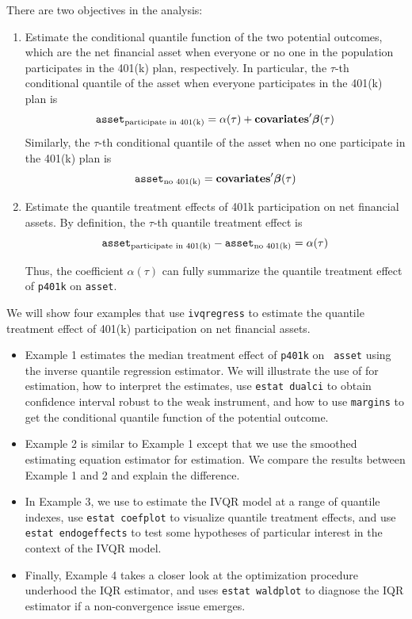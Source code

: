 There are two objectives in the analysis:
\begin{enumerate}

\item Estimate the conditional quantile function of the two potential outcomes,
which are the net financial asset when everyone or no one in the population
participates in the 401(k) plan, respectively. In particular, the $\tau$-th
conditional quantile of the asset when everyone participates in the 401(k) plan
is 
$$
{\tt asset}_{\text{participate in 401(k)}} = \alpha(\tau)
+ {\bf covariates}'\boldsymbol{\beta}(\tau)
$$
Similarly, the $\tau$-th conditional quantile of the asset when no one
participate in the 401(k) plan is
$$
{\tt asset}_{\text{no 401(k)}} = {\bf covariates}'\boldsymbol{\beta}(\tau)
$$

\item Estimate the quantile treatment effects of 401k participation on net
financial assets. By definition, the $\tau$-th quantile treatment effect is
$$
{\tt asset}_{\text{participate in 401(k)}}
-
{\tt asset}_{\text{no 401(k)}} = \alpha(\tau)
$$

Thus, the coefficient $\alpha(\tau)$ can fully summarize the quantile treatment
effect of {\tt p401k} on {\tt asset}.

\end{enumerate}

We will show four examples that use {\tt ivqregress} to estimate the quantile
treatment effect of 401(k) participation on net financial assets. 
\begin{itemize}

\item Example 1 estimates the median treatment effect of {\tt p401k} on {\tt
asset} using the inverse quantile regression estimator. We will illustrate the
use of {\ivqreg} for estimation, how to interpret the estimates, use {\tt estat
dualci} to obtain confidence interval robust to the weak instrument, and how to
use {\tt margins} to get the conditional quantile function of the potential
outcome.

\item Example 2 is similar to Example 1 except that we use the smoothed
estimating equation estimator for estimation. We compare the results between
Example 1 and 2 and explain the difference.

\item In Example 3, we use {\ivqreg} to estimate the IVQR model at a range of
quantile indexes, use {\tt estat coefplot} to visualize quantile treatment
effects, and use {\tt estat endogeffects} to test some hypotheses of particular
interest in the context of the IVQR model.

\item Finally, Example 4 takes a closer look at the optimization procedure
underhood the IQR estimator, and uses {\tt estat waldplot} to diagnose the IQR
estimator if a non-convergence issue emerges.

\end{itemize}


